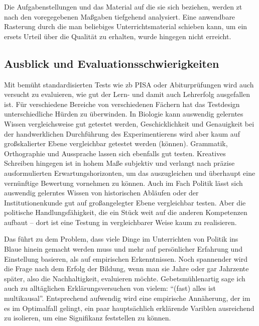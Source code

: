 Die Aufgabenstellungen und das Material auf die sie sich beziehen, werden \gls{zt} nach den voregegebenen Maßgaben tiefgehend analysiert. Eine anwendbare Rasterung durch die man beliebiges Unterrichtsmaterial schieben kann, um ein ersets Urteil über die Qualität zu erhalten, wurde hingegen nicht erreicht. 








\subsection{Ausblick und Evaluationsschwierigkeiten}
Mit bemüht standardisierten Tests wie \gls{zb} PISA oder Abiturprüfungen wird auch versucht zu evaluieren, wie gut der Lern- und damit auch Lehrerfolg ausgefallen ist. Für verschiedene Bereiche von verschiedenen Fächern hat das Testdesign unterschiedliche Hürden zu überwinden. 
In Biologie kann auswendig gelerntes Wissen vergleichsweise gut getestet werden, Geschicklichkeit und Genauigkeit bei der handwerklichen Durchführung des Experimentierens wird aber kaum auf großskalierter Ebene vergleichbar getestet werden (können).
Grammatik, Orthographie und Aussprache lassen sich ebenfalls gut testen. Kreatives Schreiben hingegen ist in hohem Maße subjektiv und verlangt nach präzise ausformulierten Erwartungshorizonten, um das auszugleichen und überhaupt eine vernünftige Bewertung vornehmen zu können. 
Auch im Fach Politik lässt sich auswendig gelerntes Wissen von historischen Abläufen oder der Institutionenkunde gut auf großangelegter Ebene vergleichbar testen. Aber die politische Handlungsfähigkeit, die ein Stück weit auf die anderen Kompetenzen aufbaut -- dort ist eine Testung in vergleichbarer Weise kaum zu realisieren. 

Das führt zu dem Problem, dass viele Dinge im Unterrichten von Politik ins Blaue hinein gemacht werden muss und mehr auf persönlicher Erfahrung und Einstellung basieren, als auf empirischen Erkenntnissen.
Noch spannender wird die Frage nach dem Erfolg der Bildung, wenn man sie Jahre oder gar Jahrzente später, also die Nachhaltigkeit, evaluieren möchte. Gebetsmühlenartig sage ich auch zu alltäglichen Erklärungsversuchen von vielem: \enquote{(fast) alles ist multikausal}. Entsprechend aufwendig wird eine empirische Annäherung, der im es im Optimalfall gelingt, ein paar hauptsächlich erklärende Variblen ausreichend zu isolieren, um eine Signifikanz feststellen zu können. 


